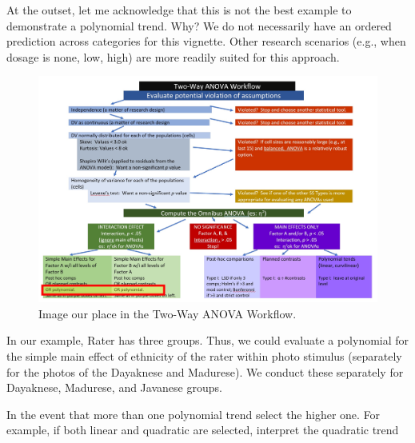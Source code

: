 \documentclass[
  11pt,
]{book}
\newenvironment{Shaded}{\begin{snugshade}}{\end{snugshade}}
\newcommand{\AttributeTok}[1]{\textcolor[rgb]{0.77,0.63,0.00}{#1}}
\newcommand{\DecValTok}[1]{\textcolor[rgb]{0.00,0.00,0.81}{#1}}
\newcommand{\FunctionTok}[1]{\textcolor[rgb]{0.00,0.00,0.00}{#1}}
\newcommand{\NormalTok}[1]{#1}
\newcommand{\OtherTok}[1]{\textcolor[rgb]{0.56,0.35,0.01}{#1}}
\newcommand{\SpecialCharTok}[1]{\textcolor[rgb]{0.00,0.00,0.00}{#1}}
\begin{document}
At the outset, let me acknowledge that this is not the best example to demonstrate a polynomial trend. Why? We do not necessarily have an ordered prediction across categories for this vignette. Other research scenarios (e.g., when dosage is none, low, high) are more readily suited for this approach.

\begin{figure}
\centering
\includegraphics{images/factorial/WrkFlw_Poly.jpg}
\caption{Image our place in the Two-Way ANOVA Workflow.}
\end{figure}

In our example, Rater has three groups. Thus, we could evaluate a polynomial for the simple main effect of ethnicity of the rater within photo stimulus (separately for the photos of the Dayaknese and Madurese). We conduct these separately for Dayaknese, Madurese, and Javanese groups.

In the event that more than one polynomial trend select the higher one. For example, if both linear and quadratic are selected, interpret the quadratic trend

\begin{Shaded}
\end{Shaded}
\end{document}
